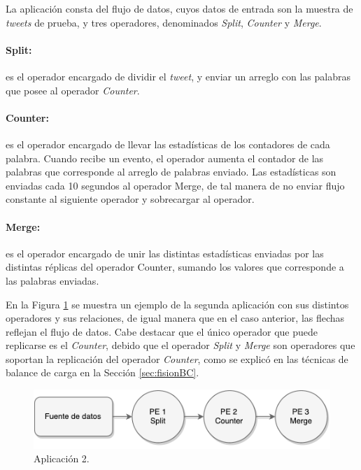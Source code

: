 La aplicación consta del flujo de datos, cuyos datos de entrada son la muestra de \textit{tweets} de prueba, y tres operadores, denominados \textit{Split}, \textit{Counter} y \textit{Merge}.

\paragraph{Split:} es el operador encargado de dividir el \textit{tweet}, y enviar un arreglo con las palabras que posee al operador \textit{Counter}.

\paragraph{Counter:} es el operador encargado de llevar las estadísticas de los contadores de cada palabra. Cuando recibe un evento, el operador aumenta el contador de las palabras que corresponde al arreglo de palabras enviado. Las estadísticas son enviadas cada 10 segundos al operador Merge, de tal manera de no enviar flujo constante al siguiente operador y sobrecargar al operador.

\paragraph{Merge:} es el operador encargado de unir las distintas estadísticas enviadas por las distintas réplicas del operador Counter, sumando los valores que corresponde a las palabras enviadas.

En la Figura \ref{fig:segundaAplicacion} se muestra un ejemplo de la segunda aplicación con sus distintos operadores y sus relaciones, de igual manera que en el caso anterior, las flechas reflejan el flujo de datos. Cabe destacar que el único operador que puede replicarse es el \textit{Counter}, debido que el operador \textit{Split} y \textit{Merge} son operadores que soportan la replicación del operador \textit{Counter}, como se explicó en las técnicas de balance de carga en la Sección \ref{sec:fisionBC}.

\begin{figure}[!ht]
	\centering
		\includegraphics[scale=0.75]{images/App2.pdf}
	\caption{Aplicación 2.}
	\label{fig:segundaAplicacion}
\end{figure}

